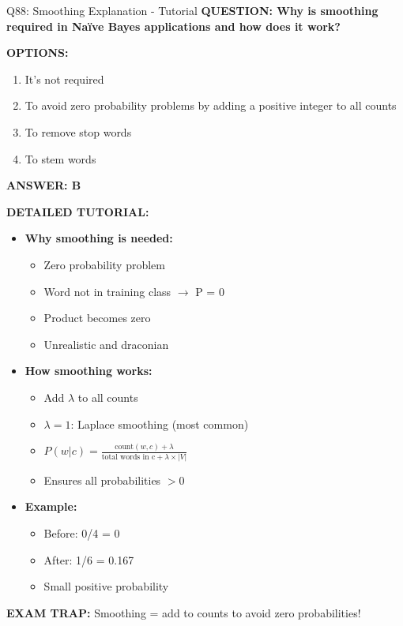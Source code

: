 \documentclass[8pt]{beamer}
\begin{document}
	\begin{frame}{Q88: Smoothing Explanation - Tutorial}
		\fontsize{6.5}{7.5}\selectfont
		\textbf{QUESTION: Why is smoothing required in Naïve Bayes applications and how does it work?}
		
		\vspace{0.1cm}
		\textbf{OPTIONS:}
		\begin{enumerate}
			\item It's not required
			\item To avoid zero probability problems by adding a positive integer to all counts
			\item To remove stop words
			\item To stem words
		\end{enumerate}
		
		\vspace{0.1cm}
		\textcolor{myblue}{\textbf{ANSWER: B}}
		
		\vspace{0.1cm}
		\textbf{DETAILED TUTORIAL:}
		\begin{itemize}
			\item \textbf{Why smoothing is needed:}
			\begin{itemize}
				\item Zero probability problem
				\item Word not in training class $\rightarrow$ P = 0
				\item Product becomes zero
				\item Unrealistic and draconian
			\end{itemize}
			\item \textbf{How smoothing works:}
			\begin{itemize}
				\item Add $\lambda$ to all counts
				\item $\lambda = 1$: Laplace smoothing (most common)
				\item $P(w|c) = \frac{\text{count}(w,c) + \lambda}{\text{total words in c} + \lambda \times |V|}$
				\item Ensures all probabilities $> 0$
			\end{itemize}
			\item \textbf{Example:}
			\begin{itemize}
				\item Before: 0/4 = 0
				\item After: 1/6 = 0.167
				\item Small positive probability
			\end{itemize}
		\end{itemize}
		
		\textcolor{myred}{\textbf{EXAM TRAP:}} Smoothing = \textcolor{myblue}{add to counts to avoid zero probabilities}!
	\end{frame}
	
\end{document}
